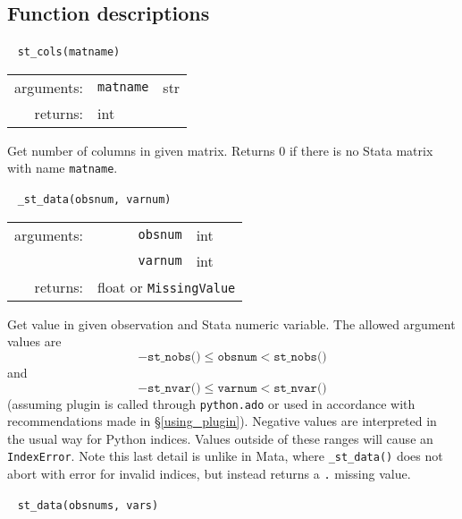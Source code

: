 \documentclass{article}
\begin{document}
\subsection{Function descriptions} \label{func_descript}
			
			
			\ \newline
			\noindent \lstinline$st_cols(matname)$
								
			\vspace{1.5mm}
			\noindent 
			\indent \begin{tabular}{rrl}
					arguments: & \texttt{matname} & str \\
					returns: & \multicolumn{2}{l}{int}
				\end{tabular}
								
			\vspace{1.5mm}
			\noindent Get number of columns in given matrix. Returns 0 if there is no Stata matrix with name \lstinline$matname$. \newline
			
			
			\ \newline
			\noindent \lstinline$_st_data(obsnum, varnum)$
								
			\vspace{1.5mm}
			\noindent 
			\indent \begin{tabular}{rrl}
					arguments: & \texttt{obsnum} & int \\
						& \texttt{varnum} & int \\
					returns: & \multicolumn{2}{l}{float or \lstinline$MissingValue$}
				\end{tabular}
								
			\vspace{1.5mm}
			\noindent Get value in given observation and Stata numeric variable. The allowed argument values are 
			\[
				-\texttt{st\_nobs()} \leq \texttt{obsnum} < \texttt{st\_nobs()}
			\]
			and
			\[
				-\texttt{st\_nvar()} \leq \texttt{varnum} < \texttt{st\_nvar()}
			\]
			(assuming plugin is called through \lstinline$python.ado$ or used in accordance with recommendations made in \S\ref{using_plugin}). Negative values are interpreted in the usual way for Python indices. Values outside of these ranges will cause an \lstinline$IndexError$. Note this last detail is unlike in Mata, where \lstinline{_st_data()} does not abort with error for invalid indices, but instead returns a \lstinline{.} missing value.
			\newline
			
			
			\ \newline
			\noindent \lstinline$st_data(obsnums, vars)$
								
\end{document}
